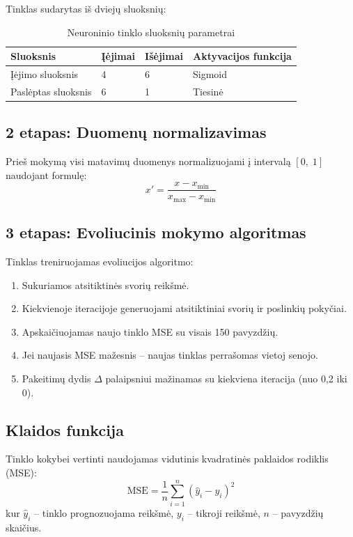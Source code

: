 \documentclass[12pt,a4paper]{article}
\begin{document}
Tinklas sudarytas iš dviejų sluoksnių:

\begin{table}[h]
\centering
\caption{Neuroninio tinklo sluoksnių parametrai}
\begin{tabular}{@{}llll@{}}
\toprule
\textbf{Sluoksnis} & \textbf{Įėjimai} & \textbf{Išėjimai} & \textbf{Aktyvacijos funkcija} \\
\midrule
Įėjimo sluoksnis    & 4 & 6 & Sigmoid \\
Paslėptas sluoksnis & 6 & 1 & Tiesinė \\
\bottomrule
\end{tabular}
\end{table}

\subsection*{2 etapas: Duomenų normalizavimas}

Prieš mokymą visi matavimų duomenys normalizuojami į intervalą $[0,\;1]$ naudojant formulę:
\[
x' = \frac{x - x_{\min}}{x_{\max} - x_{\min}}
\]

\subsection*{3 etapas: Evoliucinis mokymo algoritmas}

Tinklas treniruojamas evoliucijos algoritmo:
\begin{enumerate}
    \item Sukuriamos atsitiktinės svorių reikšmė.
    \item Kiekvienoje iteracijoje generuojami atsitiktiniai svorių ir poslinkių pokyčiai.
    \item Apskaičiuojamas naujo tinklo MSE su visais 150 pavyzdžių.
    \item Jei naujasis MSE mažesnis -- naujas tinklas perrašomas vietoj senojo.
    \item Pakeitimų dydis $\Delta$ palaipsniui mažinamas su kiekviena iteracija (nuo 0,2 iki 0).
\end{enumerate}

\subsection*{Klaidos funkcija}

Tinklo kokybei vertinti naudojamas vidutinis kvadratinės paklaidos rodiklis (MSE):
\[
\text{MSE} = \frac{1}{n}\sum_{i=1}^{n}\left(\hat{y}_i - y_i\right)^2
\]
kur $\hat{y}_i$ -- tinklo prognozuojama reikšmė, $y_i$ -- tikroji reikšmė, $n$ -- pavyzdžių skaičius.
\end{document}
